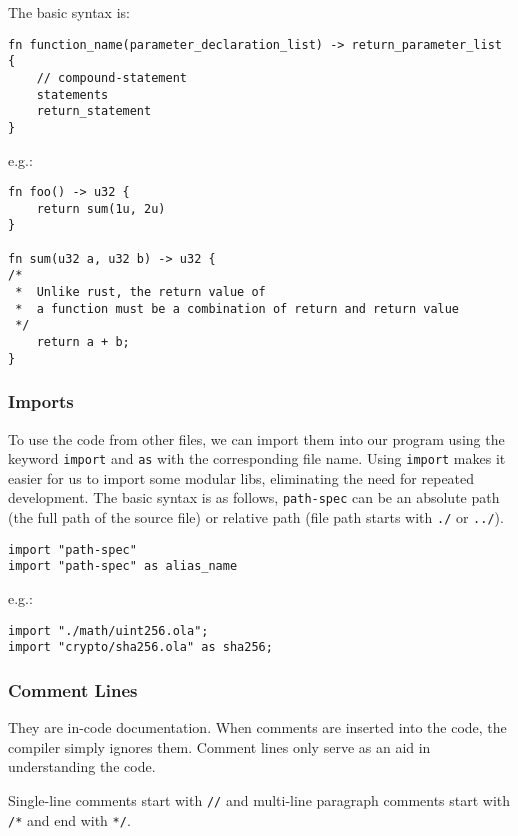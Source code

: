 The basic syntax is:

\begin{lstlisting}
fn function_name(parameter_declaration_list) -> return_parameter_list {
    // compound-statement
    statements
    return_statement
}
\end{lstlisting}

e.g.:

\begin{lstlisting}
fn foo() -> u32 {
    return sum(1u, 2u)
}

fn sum(u32 a, u32 b) -> u32 {
/* 
 *  Unlike rust, the return value of 
 *  a function must be a combination of return and return value
 */
    return a + b;
}
\end{lstlisting}

\subsubsection{Imports}

To use the code from other files, we can import them into our program using the keyword \verb|import| and \verb|as| with the corresponding file name.
Using \verb|import| makes it easier for us to import some modular libs, eliminating the need for repeated development.
The basic syntax is as follows, \verb|path-spec| can be an absolute path (the full path of the source file) or relative path (file path starts with \verb|./| or \verb|../|).

\begin{lstlisting}
import "path-spec"
import "path-spec" as alias_name
\end{lstlisting}

e.g.:

\begin{lstlisting}
import "./math/uint256.ola";
import "crypto/sha256.ola" as sha256;
\end{lstlisting}

\subsubsection{Comment Lines}

They are in-code documentation. When comments are inserted into the code, the compiler simply ignores them. Comment lines only serve as an aid in understanding the code.

Single-line comments start with \texttt{//} and multi-line paragraph comments start with \texttt{/*} and end with \texttt{*/}.

